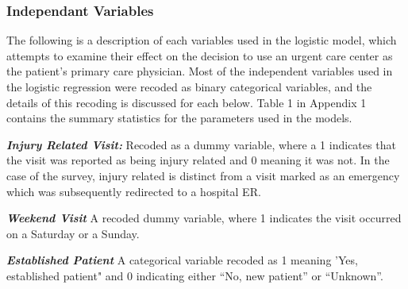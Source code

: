 \documentclass[12pt,twoside]{reedthesis}
\begin{document}
  \subsubsection*{Independant Variables}\label{independant-variables}
  
  \begin{Shaded}
  \end{Shaded}
  
  The following is a description of each variables used in the logistic
  model, which attempts to examine their effect on the decision to use an
  urgent care center as the patient's primary care physician. Most of the
  independent variables used in the logistic regression were recoded as
  binary categorical variables, and the details of this recoding is
  discussed for each below. Table 1 in Appendix 1 contains the summary
  statistics for the parameters used in the models.
  
  \textbf{\emph{Injury Related Visit:}} Recoded as a dummy variable, where
  a 1 indicates that the visit was reported as being injury related and 0
  meaning it was not. In the case of the survey, injury related is
  distinct from a visit marked as an emergency which was subsequently
  redirected to a hospital ER.
  
  \textbf{\emph{Weekend Visit}} A recoded dummy variable, where 1
  indicates the visit occurred on a Saturday or a Sunday.
  
  \textbf{\emph{Established Patient}} A categorical variable recoded as 1
  meaning 'Yes, established patient" and 0 indicating either ``No, new
  patient'' or ``Unknown''.
  
\end{document}

